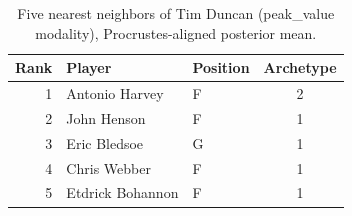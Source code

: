 \begin{table}[htbp]
  \centering\small
  \begin{tabular}{rllc}
    \toprule
    Rank & Player & Position & Archetype \\
    \midrule
    1 & Antonio Harvey & F & 2 \\
    2 & John Henson & F & 1 \\
    3 & Eric Bledsoe & G & 1 \\
    4 & Chris Webber & F & 1 \\
    5 & Etdrick Bohannon & F & 1 \\
    \bottomrule
  \end{tabular}
  \caption{Five nearest neighbors of Tim Duncan (peak_value modality), Procrustes-aligned posterior mean.}
  \label{tab:Tim_Duncan_neighbors_peak_value}
\end{table}

